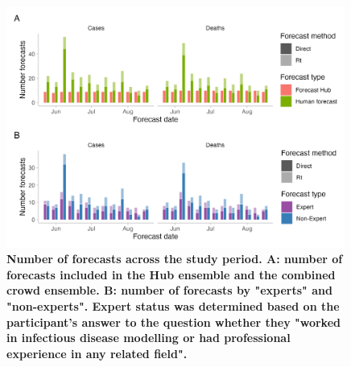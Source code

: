 \documentclass[10pt,a4paper,twocolumn]{article}
\begin{document}

\begin{figure}
\centering
\includegraphics[width=0.99\textwidth]{../output/figures/num-forecasters.png}
\caption{\bf{Number of forecasts across the study period.} A: number of forecasts included in the Hub ensemble and the combined crowd ensemble. B: number of forecasts by "experts" and "non-experts". Expert status was determined based on the participant's answer to the question whether they "worked in infectious disease modelling or had professional experience in any related field".}
\label{fig:num-forecasters-SI}
\end{figure}
\end{document}
